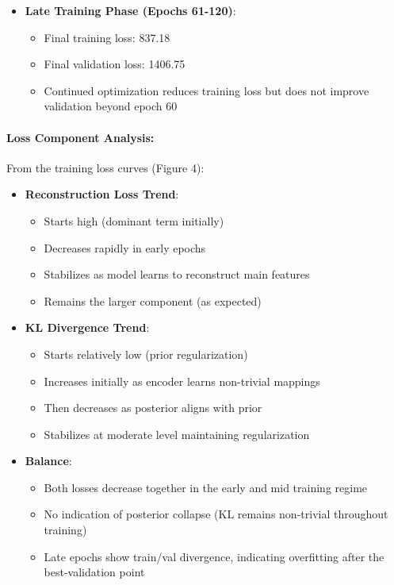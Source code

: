 \documentclass[conference]{IEEEtran}
\begin{document}
\begin{itemize}
    \item \textbf{Late Training Phase (Epochs 61-120)}:
    \begin{itemize}
        \item Final training loss: 837.18
        \item Final validation loss: 1406.75
        \item Continued optimization reduces training loss but does not improve validation beyond epoch 60
    \end{itemize}
\end{itemize}

\paragraph{Loss Component Analysis:}

From the training loss curves (Figure 4):

\begin{itemize}
    \item \textbf{Reconstruction Loss Trend}:
    \begin{itemize}
        \item Starts high (dominant term initially)
        \item Decreases rapidly in early epochs
        \item Stabilizes as model learns to reconstruct main features
        \item Remains the larger component (as expected)
    \end{itemize}
    
    \item \textbf{KL Divergence Trend}:
    \begin{itemize}
        \item Starts relatively low (prior regularization)
        \item Increases initially as encoder learns non-trivial mappings
        \item Then decreases as posterior aligns with prior
        \item Stabilizes at moderate level maintaining regularization
    \end{itemize}
    
    \item \textbf{Balance}:
    \begin{itemize}
        \item Both losses decrease together in the early and mid training regime
        \item No indication of posterior collapse (KL remains non-trivial throughout training)
        \item Late epochs show train/val divergence, indicating overfitting after the best-validation point
    \end{itemize}
\end{itemize}
\end{document}
